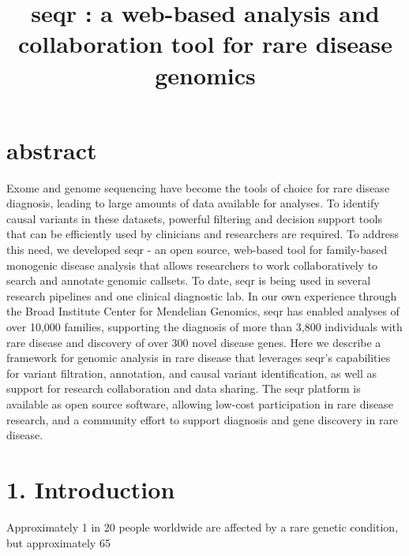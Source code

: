 \title{seqr : a web-based analysis and collaboration tool for rare disease genomics}

\section{abstract}
Exome and genome sequencing have become the tools of choice for rare disease diagnosis, leading to large amounts of data available for analyses. To identify causal variants in these datasets, powerful filtering and decision support tools that can be efficiently used by clinicians and researchers are required. To address this need, we developed seqr - an open source, web-based tool for family-based monogenic disease analysis that allows researchers to work collaboratively to search and annotate genomic callsets. To date, seqr is being used in several research pipelines and one clinical diagnostic lab. In our own experience through the Broad Institute Center for Mendelian Genomics, seqr has enabled analyses of over 10,000 families, supporting the diagnosis of more than 3,800 individuals with rare disease and discovery of over 300 novel disease genes. Here we describe a framework for genomic analysis in rare disease that leverages seqr’s capabilities for variant filtration, annotation, and causal variant identification, as well as support for research collaboration and data sharing. The seqr platform is available as open source software, allowing low-cost participation in rare disease research, and a community effort to support diagnosis and gene discovery in rare disease.

\section{1. Introduction}
Approximately 1 in 20 people worldwide are affected by a rare genetic condition, but approximately 65%